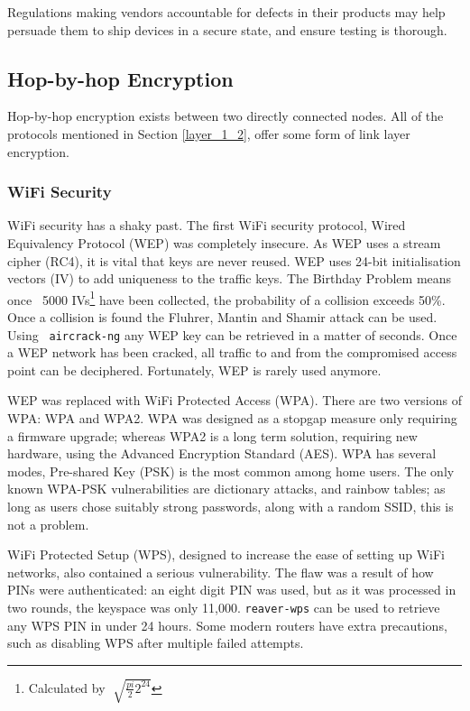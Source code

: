 \documentclass[10pt,journal,compsoc]{IEEEtran}
\begin{document}
Regulations making vendors accountable for defects in their products may help
persuade them to ship devices in a secure state, and ensure testing is
thorough. 

\subsection{Hop-by-hop Encryption}
Hop-by-hop encryption exists between two directly connected nodes. All of the
protocols mentioned in Section \ref{layer_1_2}, offer some form of link layer
encryption. 

\subsubsection{WiFi Security}
WiFi security has a shaky past. The first WiFi security protocol, Wired
Equivalency Protocol (WEP) was completely insecure. As WEP uses a stream cipher
(RC4), it is vital that keys are never reused. WEP uses 24-bit initialisation
vectors (IV) to add uniqueness to the traffic keys. The Birthday Problem means
once ~5000 IVs\footnote{Calculated by $\sqrt[]{\frac{pi}{2} 2^{24}} $} have
been collected, the probability of a collision exceeds 50\%.  Once a collision
is found the Fluhrer, Mantin and Shamir attack can be used.  Using {\tt
aircrack-ng} any WEP key can be retrieved in a matter of seconds. Once a WEP
network has been cracked, all traffic to and from the compromised access point
can be deciphered. Fortunately, WEP is rarely used anymore.

WEP was replaced with WiFi Protected Access (WPA). There are two versions of
WPA: WPA and WPA2. WPA was designed as a stopgap measure only requiring a
firmware upgrade; whereas WPA2 is a long term solution, requiring new hardware,
using the Advanced Encryption Standard (AES). WPA has several modes, Pre-shared
Key (PSK) is the most common among home users. The only known WPA-PSK
vulnerabilities are dictionary attacks, and rainbow tables; as long as users
chose suitably strong passwords, along with a random SSID, this is not a
problem. 

WiFi Protected Setup (WPS), designed to increase the ease of setting up WiFi
networks, also contained a serious vulnerability.  The flaw was a result of how
PINs were authenticated: an eight digit PIN was used, but as it was processed
in two rounds, the keyspace was only 11,000. {\tt reaver-wps} can be used to
retrieve any WPS PIN in under 24 hours. Some modern routers have extra
precautions, such as disabling WPS after multiple failed attempts. 
\end{document}
